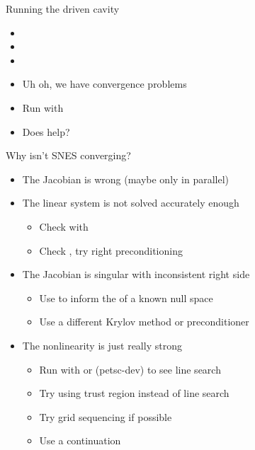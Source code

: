 
\begin{frame}{Running the driven cavity}
  \begin{itemize}
  \item {}
  \item {}
  \item {}
  \item<2-> Uh oh, we have convergence problems
  \item<2-> Run with 
  \item<2-> Does  help? 
  \end{itemize}
\end{frame}

\begin{frame}{Why isn't SNES converging?}
  \begin{itemize}
  \item The Jacobian is wrong (maybe only in parallel)
  \item The linear system is not solved accurately enough
    \begin{itemize}
    \item Check with 
    \item Check , try right preconditioning
    \end{itemize}
  \item The Jacobian is singular with inconsistent right side
    \begin{itemize}
    \item Use  to inform the  of a known null space
    \item Use a different Krylov method or preconditioner
    \end{itemize}
  \item The nonlinearity is just really strong
    \begin{itemize}
    \item Run with  or  (petsc-dev) to see line search
    \item Try using trust region instead of line search 
    \item Try grid sequencing if possible
    \item Use a continuation
    \end{itemize}
  \end{itemize}
\end{frame}

